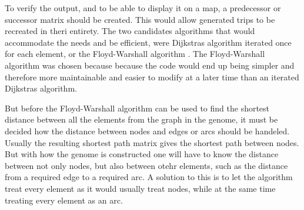 

To verify the output, and to be able to display it on a map, a predecessor or successor matrix should be created. This would allow generated trips to be recreated in theri entirety. The two candidates algorithms that would accommodate the needs and be efficient, were Dijkstras algorithm \citep{dijkstra1959note} iterated once for each element, or the Floyd-Warshall algorithm \citep{floyd1962algorithm}. The Floyd-Warshall algorithm was chosen because because the code would end up being simpler and therefore more maintainable and easier to modify at a later time than an iterated Dijkstras algorithm.

But before the Floyd-Warshall algorithm can be used to find the shortest distance between all the elements from the graph in the genome, it must be decided how the distance between nodes and edges or arcs should be handeled. Usually the resulting shortest path matrix gives the shortest path between nodes. But with how the genome is constructed one will have to know the distance between not only nodes, but also between otehr elements, such as the distance from a required edge to a required arc. A solution to this is to let the algorithm treat every element as it would usually treat nodes, while at the same time treating every element as an arc.

